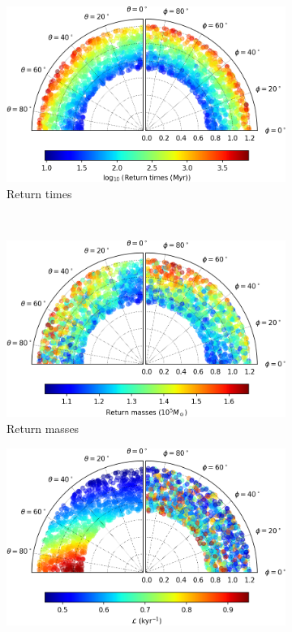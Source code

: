 \begin{figure}[h]
    \centering
    \begin{subfigure}[t]{0.4\textwidth}
        \includegraphics[width = \textwidth]{"../Files/Week 13/images/17_time"}
        \caption{Return times}
    \end{subfigure}
    ~ 
    \begin{subfigure}[t]{0.4\textwidth}
        \includegraphics[width=\textwidth]{"../Files/Week 13/images/17_mass"}
        \caption{Return masses}
    \end{subfigure}
    \begin{subfigure}[t]{0.4\textwidth}
        \includegraphics[width=\textwidth]{"../Files/Week 13/images/17_lyapunov"}

\end{subfigure}
\end{figure}
